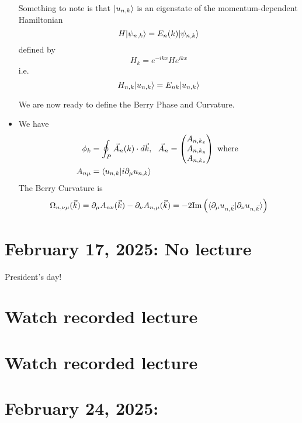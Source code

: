 \documentclass[11pt]{article}
\begin{document}
\begin{itemize}
  \begin{remark}
    {Something to note is that $\lvert u_{n,k}\rangle$ is an eigenstate of the momentum-dependent Hamiltonian $$ H \lvert\psi_{n,k}\rangle = E_{n}(k) \lvert\psi_{n,k}\rangle $$ defined by $$ H_k = e^{-ikx} H e^{ikx} $$ i.e. $$ H_{n,k}\lvert u_{n,k}\rangle = E_{nk} \lvert u_{n,k}\rangle $$}
  \end{remark} We are now ready to define the Berry Phase and Curvature.
  \item We have 
  \begin{align*}
    \phi_k &= \oint_{P} \vec{A}_n(k) \cdot d\vec{k}, ~~ \vec{A}_n = \begin{pmatrix}
      A_{n, k_x} \\
      A_{n, k_y} \\
      A_{n, k_z}
    \end{pmatrix} \text{ where } \\
    A_{n \mu} &= \langle u_{n,k} | i\partial_{\mu} u_{n,k} \rangle
  \end{align*} The Berry Curvature is $$ \Omega_{n, \nu \mu} (\vec{k}) = \partial_{\mu} A_{n\nu}(\vec{k}) - \partial_{\nu} A_{n, \mu}(\vec{k}) = -2\mathrm{Im} \left( \langle \partial_{\mu} u_{n, \vec{k}} |  \partial_{\nu} u_{n, \vec{k}} \rangle \right)$$
\end{itemize}


\pagebreak
\section{February 17, 2025: No lecture}

President's day!


\pagebreak
\section{Watch recorded lecture}




\pagebreak
\section{Watch recorded lecture}




\pagebreak
\section{February 24, 2025:}
\end{document}
